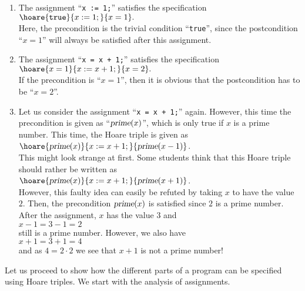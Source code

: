 \examples
\begin{enumerate}
\item The assignment ``\texttt{x := 1;}'' satisfies the specification
      \\[0.2cm]
      \hspace*{1.3cm}
      $ \hoare{\mathtt{true}}{x := 1;}{x = 1}. $
      \\[0.2cm]
      Here, the precondition is the trivial condition ``\texttt{true}'', since
      the postcondition ``$x = 1$'' will always be satisfied after this assignment.
\item The assignment  ``\texttt{x = x + 1;}'' satisfies the specification
      \\[0.2cm]
      \hspace*{1.3cm}
      $ \hoare{x=1}{x := x + 1;}{x=2}. $
      \\[0.2cm]
      If the precondition is ``$x = 1$'', then it is obvious that the postcondition has to be  
      ``$x = 2$''.
\item Let us consider the assignment ``\texttt{x = x + 1;}'' again.  However, this time
      the precondition is given as ``$\textsl{prime}(x)$'', which is only true if $x$ is a
      prime number.  This time, the Hoare triple is given as
      \\[0.2cm]
      \hspace*{1.3cm}
      $ \hoare{\textsl{prime}(x)}{x := x + 1;}{\textsl{prime}(x-1)}$.
      \\[0.2cm]
      This might look strange at first.  Some students think that this Hoare triple should rather
      be written as
      \\[0.2cm]
      \hspace*{1.3cm}
      $ \hoare{\textsl{prime}(x)}{x := x + 1;}{\textsl{prime}(x+1)} $.
      \\[0.2cm]
      However, this faulty idea can easily be refuted by taking $x$ to have the value $2$.  Then, the
      precondition $\textsl{prime}(x)$ is satisfied since $2$ is a prime number.  After the
      assignment, $x$ has the value $3$ and
      \\[0.2cm]
      \hspace*{1.3cm}
      $x - 1 = 3 - 1 = 2$
      \\[0.2cm]
      still is a prime number.  However, we also have
      \\[0.2cm]
      \hspace*{1.3cm}
      $x + 1 = 3 + 1 = 4$ 
      \\[0.2cm]
      and as $4 = 2 \cdot 2$ we see that $x + 1$ is not a prime number!
\end{enumerate}
Let us proceed to show how the different parts of a program can be specified using Hoare triples.
We start with the analysis of assignments.
 
